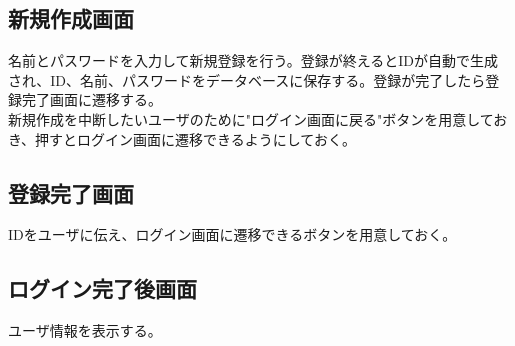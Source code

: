 \documentclass[a4paper,11pt]{jsarticle}
\begin{document}
\subsection{新規作成画面}
\noindent
名前とパスワードを入力して新規登録を行う。登録が終えるとIDが自動で生成され、ID、名前、パスワードをデータベースに保存する。登録が完了したら登録完了画面に遷移する。\\
新規作成を中断したいユーザのために"ログイン画面に戻る"ボタンを用意しておき、押すとログイン画面に遷移できるようにしておく。

\subsection{登録完了画面}
\noindent
IDをユーザに伝え、ログイン画面に遷移できるボタンを用意しておく。

\subsection{ログイン完了後画面}
\noindent
ユーザ情報を表示する。
\end{document}
